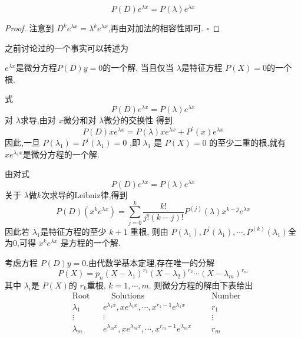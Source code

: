 \documentclass[lang=cn,12pt,color=green,fontset=none]{elegantbook}
\begin{document}
\begin{proposition}
    \[
    P\left( D \right)e^{ \lambda x}=P\left(  \lambda  \right)e^{ \lambda x}  
    \]
    
\end{proposition}
\begin{proof}
    注意到 \(  D^{k}e^{ \lambda x}=  \lambda ^{k}e^{ \lambda x}  \),再由对加法的相容性即可.
    \hfill $\square$
\end{proof}

之前讨论过的一个事实可以转述为 
\begin{proposition}
    \(  e^{\lambda x}  \)是微分方程\(  P\left( D \right)  y=0 \)的一个解, 当且仅当 \(  \lambda  \)是特征方程 \(  P\left( X \right)=0   \)的一个根.    
\end{proposition}

式 \[
P\left( D \right)e^{\lambda x} = P\left( \lambda \right)e^{\lambda x}  
\]对 \(  \lambda  \)求导,由对 \(  x  \)微分和对 \(  \lambda  \)微分的交换性  得到 \[
P\left( D \right)xe^{\lambda x} = P\left( \lambda \right) xe^{\lambda x}+ P^{\prime} \left( x \right)e^{ \lambda x}   
\] 因此,一旦 \(  P\left( \lambda_1 \right)=P^{\prime} \left( \lambda_1 \right)=0    \) ,即 \(  \lambda_1  \) 是 \(  P\left( X \right)=0   \) 的至少二重的根,就有 \(  xe^{\lambda_1 x}  \)是微分方程的一个解. 


由对式 \[
P\left( D \right)e^{\lambda x}=P\left( \lambda \right)e^{\lambda x}  
\]关于 \(  \lambda  \)做\(  k  \)次求导的Leibniz律,得到 \[
P\left( D \right)\left( x^{k}e^{\lambda x} \right)= \sum _{j=0}^{k} \frac{k! }{j!\left( k-j \right)!  } P^{\left( j \right) }\left( \lambda \right)x^{k-j}e^{\lambda x}    
\]  
因此若 \(  \lambda_1  \)是特征方程的至少 \(  k+ 1  \)  重根, 则由 \(  P\left( \lambda_1 \right)   ,P^{\prime} \left( \lambda_1 \right),\cdots ,P^{\left( k \right) }\left( \lambda_1 \right)  \)全为0,可得 \(  x^{k}e^{\lambda x}  \)  是方程的一个解.

\begin{theorem}
    考虑方程 \(  P\left( D \right)y=0   \).由代数学基本定理,存在唯一的分解 \[
    P\left( X \right)=p_{n}\left( X-\lambda_1 \right)^{r_1}\left( X-\lambda_2 \right)^{r_2}\cdots \left( X-\lambda_{m} \right)^{r_{m}}    
    \] 其中 \(  \lambda_{i}  \)是 \(  P\left( X \right)   \)的 \(  r_{k}  \)重根, \(  k= 1,\cdots,m   \).
    则微分方程的解由下表给出 \[
    \begin{aligned}
    & \mathrm{Root} &&\quad  \mathrm{Solutions} &&& \mathrm{Number}\\ 
    & \lambda_1  && e^{\lambda_1x},xe^{\lambda_1x},\cdots ,x^{r_1-1}e^{\lambda_1x} &&& r_1\\ 
     &\vdots     && \vdots &&& \vdots\\ 
      & \lambda_{m} && e^{\lambda_mx},xe^{\lambda_mx},\cdots ,x^{r_{m}-1}e^{\lambda_{m}x}&&& r_{m}
    \end{aligned}
    \]    
\end{theorem}
\end{document}
